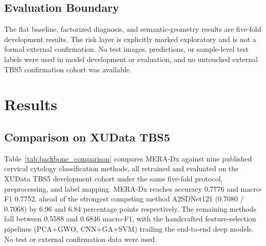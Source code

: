 \documentclass[conference]{IEEEtran}
\begin{document}
\subsection{Evaluation Boundary}
The flat baseline, factorized diagnosis, and semantic-geometry results
are five-fold development results. The risk layer is explicitly marked
exploratory and is not a formal external confirmation. No test images,
predictions, or sample-level test labels were used in model development
or evaluation, and no untouched external TBS5 confirmation cohort was
available.

\section{Results}
\label{sec:results}

\subsection{Comparison on XUData TBS5}
\label{sec:backbone_comparison}
Table~\ref{tab:backbone_comparison} compares MERA-Dx against nine published
cervical cytology classification methods, all retrained and evaluated on the
XUData TBS5 development cohort under the same five-fold protocol,
preprocessing, and label mapping. MERA-Dx reaches accuracy 0.7776 and
macro-F1 0.7752, ahead of the strongest competing method A2SDNet121
(0.7080 / 0.7068) by 6.96 and 6.84 percentage points respectively. The
remaining methods fall between 0.5588 and 0.6846 macro-F1, with the
handcrafted feature-selection pipelines (PCA+GWO, CNN+GA+SVM) trailing the
end-to-end deep models. No test or external confirmation data were used.
\end{document}
